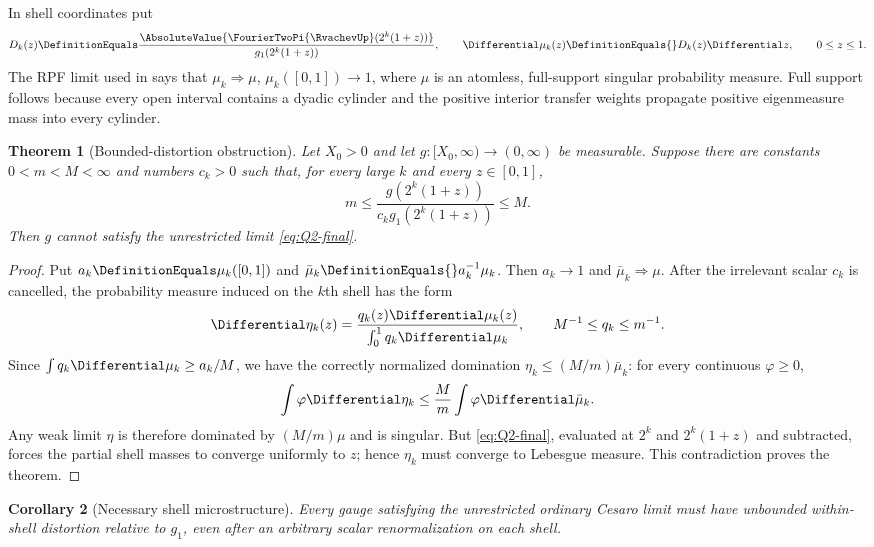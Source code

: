 \documentclass[11pt,oneside]{article}
\numberwithin{equation}{section}
\newtheorem{theorem}{Theorem}[section]
\newtheorem{corollary}[theorem]{Corollary}
\theoremstyle{definition}
\theoremstyle{remark}
\begin{document}
In shell coordinates put
\begin{equation}
 D_k(z)\DefinitionEquals\frac{\AbsoluteValue{\FourierTwoPi{\RvachevUp}(2^k(1+z))}}{g_1(2^k(1+z))},
 \qquad \Differential\mu_k(z)\DefinitionEquals{}D_k(z)\Differential z,
 \qquad 0\le z\le1.
 \label{eq:shell-finite-measures}
\end{equation}
The RPF limit used in  says that
$\mu_k\Rightarrow\mu$, $\mu_k([0,1])\to1$, where $\mu$ is an atomless,
full-support singular probability measure.  Full support follows because every open interval
contains a dyadic cylinder and the positive interior transfer weights propagate positive
eigenmeasure mass into every cylinder.

\begin{theorem}[Bounded-distortion obstruction]
\label{thm:bounded-distortion}
Let $X_0>0$ and let $g:[X_0,\infty)\to(0,\infty)$ be measurable.  Suppose there are
constants $0<m<M<\infty$ and numbers $c_k>0$ such that, for every large $k$ and every
$z\in[0,1]$,
\begin{equation}
 m\le
 \frac{g(2^k(1+z))}{c_kg_1(2^k(1+z))}
 \le M.
 \label{eq:bounded-distortion}
\end{equation}
Then $g$ cannot satisfy the unrestricted limit \eqref{eq:Q2-final}.
\end{theorem}

\begin{proof}
Put $a_k\DefinitionEquals\mu_k([0,1])$ and $\bar\mu_k\DefinitionEquals{}a_k^{-1}\mu_k$.  Then
$a_k\to1$ and $\bar\mu_k\Rightarrow\mu$.  After the irrelevant scalar $c_k$ is cancelled,
the probability measure induced on the $k$th shell has the form
\[
 \Differential\eta_k(z)=
 \frac{q_k(z)\Differential\mu_k(z)}{\int_0^1q_k\Differential\mu_k},
 \qquad M^{-1}\le q_k\le m^{-1}.
\]
Since $\int q_k\Differential\mu_k\ge a_k/M$, we have the correctly normalized domination
$\eta_k\le(M/m)\bar\mu_k$: for every continuous $\varphi\ge0$,
\[
 \int\varphi\Differential\eta_k\le\frac{M}{m}\int\varphi\Differential\bar\mu_k.
\]
Any weak limit $\eta$ is therefore dominated by $(M/m)\mu$ and is singular.  But
\eqref{eq:Q2-final}, evaluated at $2^k$ and $2^k(1+z)$ and subtracted, forces the partial
shell masses to converge uniformly to $z$; hence $\eta_k$ must converge to Lebesgue
measure.  This contradiction proves the theorem.
\end{proof}

\begin{corollary}[Necessary shell microstructure]
\label{cor:necessary-microstructure}
Every gauge satisfying the unrestricted ordinary Cesaro limit must have unbounded
within-shell distortion relative to $g_1$, even after an arbitrary scalar renormalization
on each shell.
\end{corollary}
\end{document}
